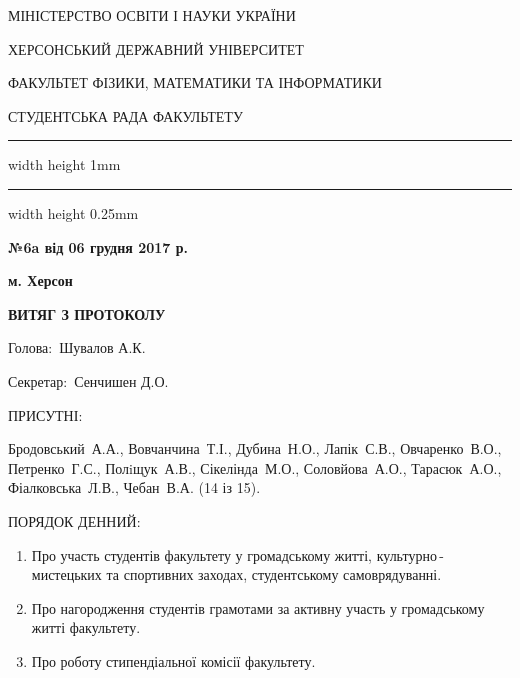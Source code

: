 \documentclass[
	a4paper,
	12pt,
	oneside,
	draft
]{extreport}
\newcommand{\heading}{\begin{center}
\parindent=0cm\parskip=-0.1cm\bfseries\footnotesize
\par МІНІСТЕРСТВО ОСВІТИ І НАУКИ УКРАЇНИ
\par ХЕРСОНСЬКИЙ ДЕРЖАВНИЙ УНІВЕРСИТЕТ
\par ФАКУЛЬТЕТ ФІЗИКИ, МАТЕМАТИКИ ТА ІНФОРМАТИКИ
\parskip=-0.2cm\par\large СТУДЕНТСЬКА РАДА ФАКУЛЬТЕТУ
\par\hrule width \hsize height 1mm \kern 0.25mm \hrule width \hsize height 0.25mm
\end{center}}
\newcommand{\Requisites}[4]{\par\noindent
\begin{minipage}[t]{80mm}
	\begin{minipage}[t]{\textwidth}
		{\par\noindent\textbf{№#1 від #2}}
	\end{minipage}
	\par	
	\begin{minipage}[t]{\textwidth}
		{\par\noindent #3}	
	\end{minipage}
\end{minipage}
\hfill
\begin{minipage}[t]{60mm}
	\par\noindent #4
\end{minipage}
}
\newcommand{\Attendees}[1]{{\par\noindent ПРИСУТНІ: \par #1}}
\newcommand{\topic}[1]{\item #1}
\newenvironment{protocolAgenda}
	{\bigskip\par\noindent ПОРЯДОК ДЕННИЙ:
		\begin{enumerate}[topsep=0pt,itemsep=-1ex,partopsep=1ex,parsep=1ex]}
	{\end{enumerate}}
\begin{document}
\pagestyle{empty}
\heading
\Requisites
{6a}
{06 грудня 2017 р.}
{}{\hfill\bfseries  м. Херсон}

\begin{center}\textbf{ВИТЯГ З ПРОТОКОЛУ}\end{center}

\par\noindent Голова:~Шувалов А.К.
\par\noindent Секретар:~Сенчишен Д.О.

\Attendees{
Бродовський~А.А.,
Вовчанчина~Т.І.,
Дубина~Н.О.,
Лапік~С.В.,
Овчаренко~В.О.,
Петренко~Г.С.,
Полiщук~А.В.,
Сікелінда~М.О.,
Соловйова~А.О.,
Тарасюк~А.О.,
Фіалковська~Л.В.,
Чебан~В.А.
(14 із 15).}

\begin{protocolAgenda}
\topic{Про участь студентів факультету у громадському житті, культурно\,-\,мистецьких та спортивних заходах, студентському самоврядуванні.}
\topic{Про нагородження студентів грамотами за активну участь у громадському житті факультету.}
\topic{Про роботу стипендіальної комісії факультету.}
\end{protocolAgenda}
\end{document}
